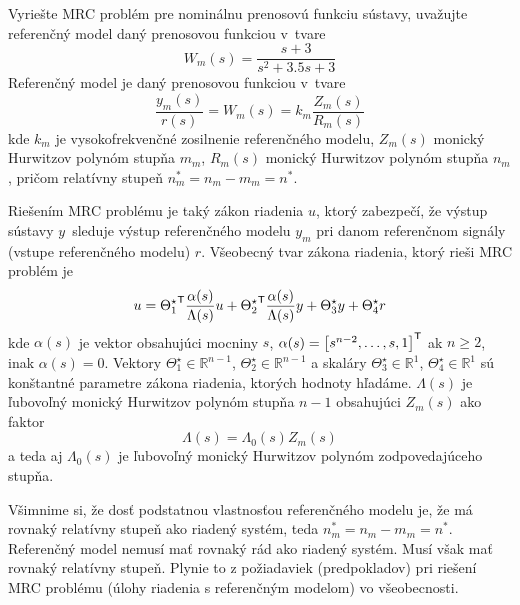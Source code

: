 \documentclass[a4paper, 10pt, ]{article}
\begin{document}
{\color{gray}

Vyriešte MRC problém pre nominálnu prenosovú funkciu sústavy, uvažujte referenčný model daný prenosovou funkciou v~tvare
\begin{equation*}
    W_m(s) = \frac{s + 3}{ s^2 + 3.5 s + 3}
\end{equation*}
Referenčný model je daný prenosovou funkciou v~tvare
\begin{equation*}
    \frac{y_m(s)}{r(s)} = W_m(s) = k_m \frac{Z_m(s)}{R_m(s)}
\end{equation*}
kde $k_m$ je vysokofrekvenčné zosilnenie referenčného modelu, $Z_m(s)$ monický Hurwitzov polynóm stupňa $m_m$, $R_m(s)$ monický Hurwitzov polynóm stupňa $n_m$, pričom relatívny stupeň $n^*_m = n_m - m_m = n^*$.

Riešením MRC problému je taký zákon riadenia $u$, ktorý zabezpečí, že výstup sústavy $y$~sleduje výstup referenčného modelu $y_m$ pri danom referenčnom signály (vstupe referenčného modelu) $r$. Všeobecný tvar zákona riadenia, ktorý rieši MRC problém je
\begin{equation*}
    u = {\Theta_1^\star}^{\mathsf{T}} \frac{\alpha(s)}{\Lambda(s)} u + {\Theta_2^\star}^{\mathsf{T}} \frac{\alpha(s)}{\Lambda(s)} y + \Theta_3^\star y + \Theta_4^\star r
\end{equation*}
kde $\alpha(s)$ je vektor obsahujúci mocniny $s$, $\alpha(s) = \begin{bmatrix} s^{n-2}, \ldots,s, 1 \end{bmatrix}^{\mathsf{T}}$ ak $n\geq 2$, inak $\alpha(s) = 0$. Vektory $\Theta_1^\star \in \mathbb{R}^{n-1}$, $\Theta_2^\star \in \mathbb{R}^{n-1}$ a skaláry $\Theta_3^\star \in \mathbb{R}^1$, $\Theta_4^\star \in \mathbb{R}^1$ sú konštantné parametre zákona riadenia, ktorých hodnoty hľadáme.  $\Lambda(s)$ je ľubovoľný monický Hurwitzov polynóm stupňa $n-1$ obsahujúci $Z_m(s)$ ako faktor
\begin{equation*}
    \Lambda(s) = \Lambda_0(s) Z_m(s)
\end{equation*}
a teda aj $\Lambda_0(s)$ je ľubovoľný monický Hurwitzov polynóm zodpovedajúceho stupňa.

}

\smallskip



Všimnime si, že dosť podstatnou vlastnosťou referenčného modelu je, že má rovnaký relatívny stupeň ako riadený systém, teda $n^*_m = n_m - m_m = n^*$. Referenčný model  nemusí mať rovnaký rád ako riadený systém. Musí však mať rovnaký relatívny stupeň. Plynie to z požiadaviek (predpokladov) pri riešení MRC problému (úlohy riadenia s referenčným modelom) vo všeobecnosti.
\end{document}
